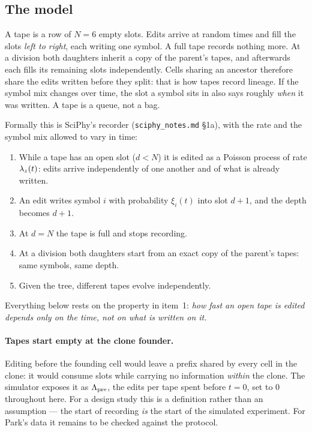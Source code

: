 \subsection{The model}\label{sec:edit-model}

A tape is a row of $N=6$ empty slots. Edits arrive at random times and fill the slots \emph{left to
right}, each writing one symbol. A full tape records nothing more. At a division both daughters
inherit a copy of the parent's tapes, and afterwards each fills its remaining slots independently.
Cells sharing an ancestor therefore share the edits written before they split: that is how tapes
record lineage. If the symbol mix changes over time, the slot a symbol sits in also says roughly
\emph{when} it was written. A tape is a queue, not a bag.

Formally this is SciPhy's recorder (\texttt{sciphy\_notes.md} \S1a), with the rate and the symbol mix
allowed to vary in time:
\clearpage
\begin{enumerate}
  \item While a tape has an open slot ($d<N$) it is edited as a Poisson process of
        rate $\lambda_z(t)$: edits arrive independently of one another and of what is already written.
  \item An edit writes symbol $i$ with probability $\xi_i(t)$ into slot $d+1$, and the
        depth becomes $d+1$.
  \item At $d=N$ the tape is full and stops recording.
  \item At a division both daughters start from an exact copy of the parent's
        tapes: same symbols, same depth.
  \item Given the tree, different tapes evolve independently.
\end{enumerate}
Everything below rests on the property in item~1: \emph{how fast an open tape is edited depends only
on the time, not on what is written on it.}

\paragraph{Tapes start empty at the clone founder.} Editing before the founding cell would leave a
prefix shared by every cell in the clone: it would consume slots while carrying no information
\emph{within} the clone. The simulator exposes it as $\Lambda_{\rm pre}$, the edits per tape spent
before $t=0$, set to $0$ throughout here. For a design study this is a definition rather than an
assumption --- the start of recording \emph{is} the start of the simulated experiment. For Park's data
it remains to be checked against the protocol.

